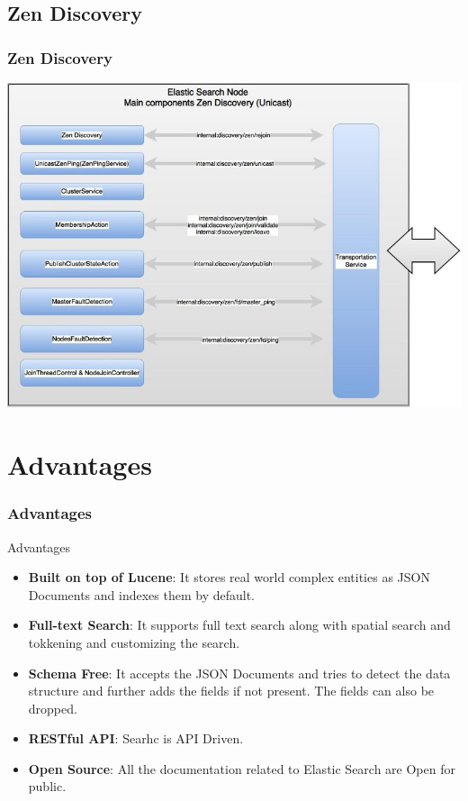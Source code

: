 \documentclass[xcolor=dvipsnames]{beamer}
\begin{document}
\subsection{Zen Discovery}
\begin{frame}
\frametitle{Zen Discovery}
\begin{center}
\includegraphics[scale=0.34]{zen.jpg}
\end{center}
\end{frame}
\section{Advantages}
\begin{frame}
\frametitle{Advantages}
\begin{exampleblock}{Advantages}
\begin{itemize}
\item \textbf{Built on top of Lucene}: It stores real world complex entities as JSON Documents and indexes them by default.
\item \textbf{Full-text Search}: It supports full text search along with spatial search and tokkening and customizing the search.
\item \textbf{Schema Free}: It accepts the JSON Documents and tries to detect the data structure and further adds the fields if not present. The fields can also be dropped.
\item \textbf{RESTful API}: Searhc is API Driven.
\item \textbf{Open Source}: All the documentation related to Elastic Search are Open for public.
\end{itemize}
\end{exampleblock}
\end{frame}
\end{document}
